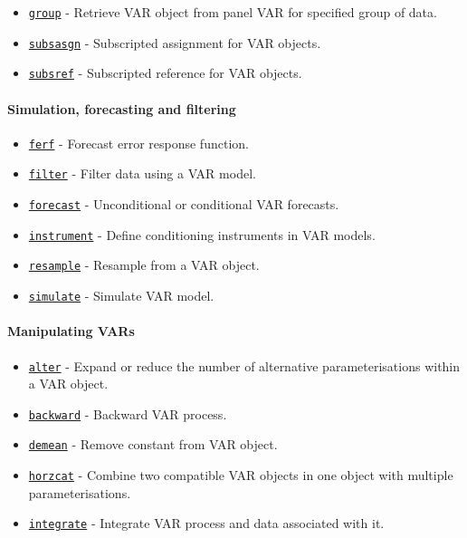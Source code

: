 \begin{itemize}
\itemsep1pt\parskip0pt
\item
  \href{VAR/group}{\texttt{group}} - Retrieve VAR object from panel VAR
  for specified group of data.
\item
  \href{VAR/subsasgn}{\texttt{subsasgn}} - Subscripted assignment for
  VAR objects.
\item
  \href{VAR/subsref}{\texttt{subsref}} - Subscripted reference for VAR
  objects.
\end{itemize}

\paragraph{Simulation, forecasting and
filtering}

\begin{itemize}
\itemsep1pt\parskip0pt
\item
  \href{VAR/ferf}{\texttt{ferf}} - Forecast error response function.
\item
  \href{VAR/filter}{\texttt{filter}} - Filter data using a VAR model.
\item
  \href{VAR/forecast}{\texttt{forecast}} - Unconditional or conditional
  VAR forecasts.
\item
  \href{VAR/instrument}{\texttt{instrument}} - Define conditioning
  instruments in VAR models.
\item
  \href{VAR/resample}{\texttt{resample}} - Resample from a VAR object.
\item
  \href{VAR/simulate}{\texttt{simulate}} - Simulate VAR model.
\end{itemize}

\paragraph{Manipulating VARs}

\begin{itemize}
\itemsep1pt\parskip0pt
\item
  \href{VAR/alter}{\texttt{alter}} - Expand or reduce the number of
  alternative parameterisations within a VAR object.
\item
  \href{VAR/backward}{\texttt{backward}} - Backward VAR process.
\item
  \href{VAR/demean}{\texttt{demean}} - Remove constant from VAR object.
\item
  \href{VAR/horzcat}{\texttt{horzcat}} - Combine two compatible VAR
  objects in one object with multiple parameterisations.
\item
  \href{VAR/integrate}{\texttt{integrate}} - Integrate VAR process and
  data associated with it.
\end{itemize}

